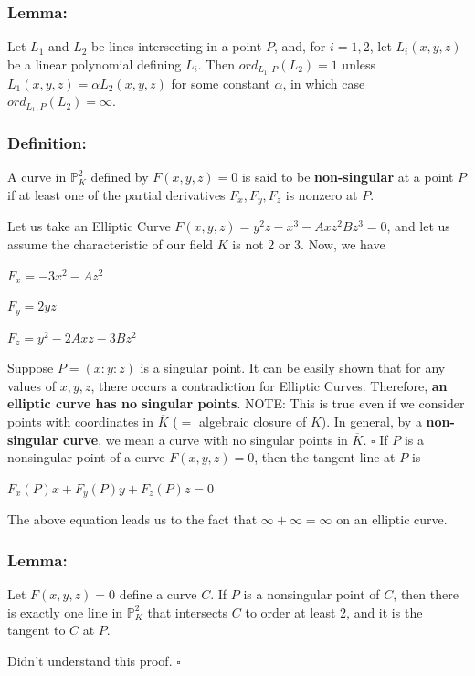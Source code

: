 \documentclass[a4paper, 12pt]{article}
\begin{document}
\subsubsection{Lemma: }
Let $L_1$ and $L_2$ be lines intersecting in a point $P$, and, for $i = 1, 2$, let $L_i(x,y,z)$ be a linear polynomial defining $L_i$. Then $ord_{L_1,P}(L_2) = 1$ unless $L_1(x,y,z) = \alpha L_2(x,y,z)$ for some constant $\alpha$, in which case $ord_{L_1,P}(L_2) = \infty$.
\subsubsection{Definition: }
A curve in $\mathbb{P}_K^2$ defined by $F(x,y,z) = 0$ is said to be \textbf{non-singular} at a point $P$ if at least one of the partial derivatives $F_x,F_y,F_z$ is nonzero at $P$.\par
Let us take an Elliptic Curve $F(x,y,z) = y^2z - x^3 - Axz^2  Bz^3 = 0$, and let us assume the characteristic of our field $K$ is not 2 or 3. Now, we have
\begin{center}
$F_x = -3x^2 - Az^2$\par
$F_y = 2yz$\par
$F_z = y^2 - 2Axz - 3Bz^2$
\end{center}
Suppose $P = (x:y:z)$ is a singular point. It can be easily shown that for any values of $x, y, z$, there occurs a contradiction for Elliptic Curves. Therefore, \textbf{an elliptic curve has no singular points}. \newline
NOTE: This is true even if we consider points with coordinates in $\overline{K}$ ($=$ algebraic closure of $K$). In general, by a \textbf{non-singular curve}, we mean a curve with no singular points in $\overline{K}$.
$\square$\newline
If $P$ is a nonsingular point of a curve $F(x,y,z)=0$, then the tangent line at $P$ is
\begin{center}
$F_x(P)x + F_y(P)y + F_z(P)z = 0$
\end{center}
The above equation leads us to the fact that $\infty + \infty = \infty$ on an elliptic curve.
\subsubsection{Lemma: }
Let $F(x,y,z)=0$ define a curve $C$. If $P$ is a nonsingular point of $C$, then there is exactly one line in $\mathbb{P}_K^2$ that intersects $C$ to order at least 2, and it is the tangent to $C$ at $P$.\par
Didn't understand this proof.
$\square$
\end{document}
